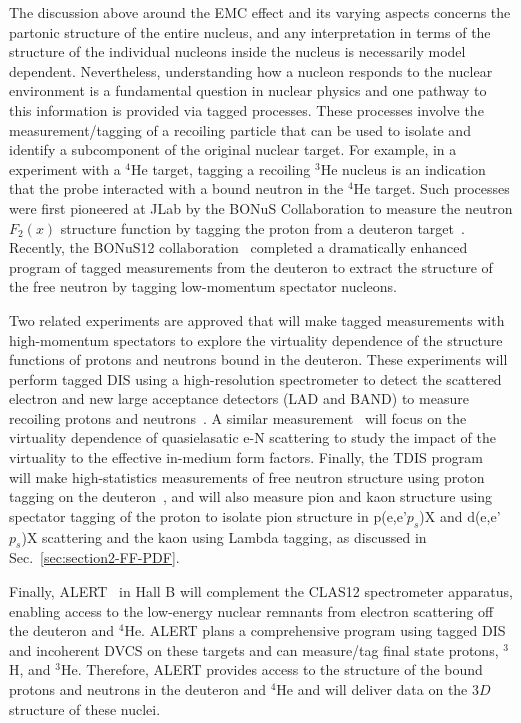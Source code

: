 The discussion above around the EMC effect and its varying aspects concerns the partonic structure of the entire nucleus, and any interpretation in terms of the structure of the individual nucleons inside the nucleus is necessarily model dependent. Nevertheless, understanding how a nucleon responds to the nuclear environment is a fundamental question in nuclear physics and one pathway to this information is provided via tagged processes. These processes involve the measurement/tagging of a recoiling particle that can be used to isolate and identify a subcomponent of the original nuclear target. For example, in a experiment with a $^4$He target, tagging a recoiling $^3$He nucleus is an indication that the probe interacted with a bound neutron in the $^4$He target. Such processes were first pioneered at JLab by the BONuS Collaboration to measure the neutron $F_2(x)$ structure function by tagging the proton from a deuteron target~\cite{CLAS:2011qvj,CLAS:2014jvt}.
Recently, the BONuS12 collaboration~\cite{BONUS12,CLAS:2018unv} completed a dramatically enhanced program of tagged measurements from the deuteron to extract the structure of the free neutron by tagging low-momentum spectator nucleons.  

Two related experiments are approved that will make tagged measurements with high-momentum spectators to explore the virtuality dependence of the structure functions of protons and neutrons bound in the deuteron. These experiments will perform tagged DIS using a high-resolution spectrometer to detect the scattered electron and new large acceptance detectors (LAD and BAND) to measure recoiling protons and neutrons~\cite{Segarra:2020txy}. A similar measurement~\cite{E12-11-002} will focus on the virtuality dependence of quasielasatic e-N scattering to study the impact of the virtuality to the effective in-medium form factors. Finally, the TDIS program~\cite{C12-15-006A,E12-15-006} will make high-statistics measurements of free neutron structure using proton tagging on the deuteron~\cite{C12-15-006B}, and will also measure pion and kaon structure using spectator tagging of the proton to isolate pion structure in p(e,e'$p_s$)X and d(e,e'$p_s$)X scattering and the kaon using Lambda tagging, as discussed in Sec.~\ref{sec:section2-FF-PDF}.

Finally, ALERT~\cite{Armstrong:2017zcm,Armstrong:2017zqr,Armstrong:2017wfw} in Hall B will complement the CLAS12 spectrometer apparatus, enabling access to the low-energy nuclear remnants from electron scattering off the deuteron and $^4$He. ALERT plans a comprehensive program using tagged DIS and incoherent DVCS on these targets and can measure/tag final state protons, $^3$H, and $^3$He. Therefore, ALERT provides access to the structure of the bound protons and neutrons in the deuteron and $^4$He and will deliver data on the 3$D$ structure of these nuclei. 



